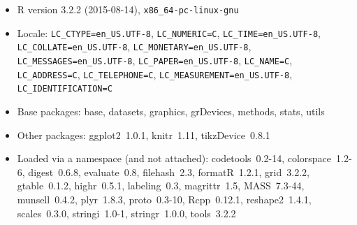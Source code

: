 \documentclass{article}\usepackage[]{graphicx}\usepackage[]{color}
\theoremstyle{rcode}
\begin{document}
\begin{itemize}\raggedright
  \item R version 3.2.2 (2015-08-14), \verb|x86_64-pc-linux-gnu|
  \item Locale: \verb|LC_CTYPE=en_US.UTF-8|, \verb|LC_NUMERIC=C|, \verb|LC_TIME=en_US.UTF-8|, \verb|LC_COLLATE=en_US.UTF-8|, \verb|LC_MONETARY=en_US.UTF-8|, \verb|LC_MESSAGES=en_US.UTF-8|, \verb|LC_PAPER=en_US.UTF-8|, \verb|LC_NAME=C|, \verb|LC_ADDRESS=C|, \verb|LC_TELEPHONE=C|, \verb|LC_MEASUREMENT=en_US.UTF-8|, \verb|LC_IDENTIFICATION=C|
  \item Base packages: base, datasets, graphics, grDevices,
    methods, stats, utils
  \item Other packages: ggplot2~1.0.1, knitr~1.11,
    tikzDevice~0.8.1
  \item Loaded via a namespace (and not attached):
    codetools~0.2-14, colorspace~1.2-6, digest~0.6.8,
    evaluate~0.8, filehash~2.3, formatR~1.2.1, grid~3.2.2,
    gtable~0.1.2, highr~0.5.1, labeling~0.3, magrittr~1.5,
    MASS~7.3-44, munsell~0.4.2, plyr~1.8.3, proto~0.3-10,
    Rcpp~0.12.1, reshape2~1.4.1, scales~0.3.0, stringi~1.0-1,
    stringr~1.0.0, tools~3.2.2
\end{itemize}
\end{document}
